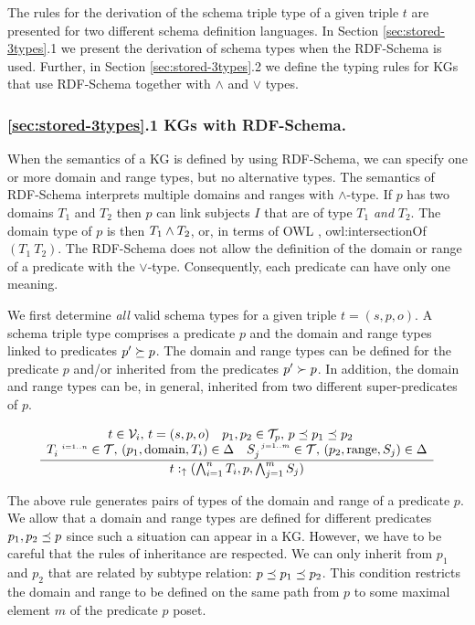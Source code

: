 \documentclass[runningheads]{llncs}
\newcommand{\s}{\scriptscriptstyle\ \,}
\newcommand{\uarr}{\uparrow}
\newcommand{\V}{{\cal V}}
\newcommand{\T}{{\cal T}}
\begin{document}
The rules for the derivation of the schema triple type of a given
triple $t$ are presented for two different schema definition
languages. In Section \ref{sec:stored-3types}.1 we present the
derivation of schema types when the RDF-Schema is used. Further, in
Section \ref{sec:stored-3types}.2 we define the typing rules for
KGs that use RDF-Schema together with $\land$ and $\lor$ types.






\subsubsection{\ref{sec:stored-3types}.1 KGs with RDF-Schema.}
When the semantics of a KG is defined by using RDF-Schema, we can
specify one or more domain and range types, but no alternative
types. The semantics of RDF-Schema \cite{rdfsemantics} interprets
multiple domains and ranges with $\land$-type. If $p$ has two domains
$T_1$ and $T_2$ then $p$ can link subjects $I$ that are of type $T_1$
\emph{and} $T_2$. The domain type of $p$ is then $T_1\land\/T_2$, or,
in terms of OWL \cite{owl}, owl:intersectionOf$(T_1\ T_2)$. The
RDF-Schema does not allow the definition of the domain or range of a
predicate with the $\lor$-type. Consequently, each predicate can have
only one meaning.

We first determine \emph{all} valid schema types for a given triple
$t=(s,p,o)$. A schema triple type comprises a predicate $p$ and the
domain and range types linked to predicates $p'\succeq\/p$. The domain
and range types can be defined for the predicate $p$ and/or inherited
from the predicates $p'\succ\/p$. In addition, the domain and range
types can be, in general, inherited from two different
super-predicates of $p$.

\begin{equation}
\label{rul:3-stored1}
\dfrac{\begin{array}{c}
       t\in\V_i,\, t=(s,p,o)\quad p_1,p_2\in\T_p,\, p\preceq\/p_1\preceq\/p_2\quad \\
       T_i^{\s\/i=1..n}\in\T,\, (p_1,\text{domain},T_i)\in\/\Delta\quad S_j^{\s\/j=1..m}\in\T,\, (p_2,\text{range},S_j)\in\Delta
       \end{array}}
      {t:_\uarr\/(\bigwedge_{i=1}^n\/T_i, p, \bigwedge_{j=1}^m\/S_j)}
\end{equation}

The above rule generates pairs of types of the domain and range of a
predicate $p$. We allow that a domain and range types are defined for
different predicates $p_1,p_2\preceq\/p$ since such a situation can
appear in a KG. However, we have to be careful that the rules of
inheritance are respected. We can only inherit from $p_1$ and $p_2$
that are related by subtype relation:
$p\preceq\/p_1\preceq\/p_2$. This condition restricts the domain and
range to be defined on the same path from $p$ to some maximal element
$m$ of the predicate $p$ poset. 
\end{document}
